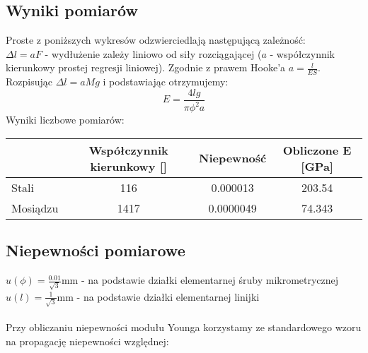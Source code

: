 \documentclass[12pt]{article}
\begin{document}
\subsection{Wyniki pomiarów}
Proste z poniższych wykresów odzwierciedlają następującą zależność: \\

$\Delta l = aF$ - wydłużenie zależy liniowo od siły rozciągającej ($a$ - współczynnik kierunkowy prostej regresji liniowej). Zgodnie z prawem Hooke'a $a =\frac{l}{ES}$. Rozpisując $\Delta l = a M g$ i podstawiając otrzymujemy:
\begin{equation}
    E = \frac{4lg}{\pi \phi^{2} a}
\end{equation}
Wyniki liczbowe pomiarów:
\begin{table}[ht]
\centering
\begin{tabular}{l|c|c|c|}
\cline{2-4}
                               & Współczynnik kierunkowy [\si{\frac{\um}{\N}}] & Niepewność & Obliczone E [\si{\GPa}] \\ \hline
\multicolumn{1}{|l|}{Stali}  & 116              & 0.000013   & 203.54\\ \hline
\multicolumn{1}{|l|}{Mosiądzu} & 1417              & 0.0000049  & 74.343 \\ \hline
\end{tabular}
\end{table}

\subsection{Niepewności pomiarowe}
$u(\phi) = \frac{0.01}{\sqrt{3}}\si{\mm}$ - na podstawie działki elementarnej śruby mikrometrycznej\\
$u(l) = \frac{1}{\sqrt{3}}\si{\mm}$ - na podstawie działki elementarnej linijki
\\\\
Przy obliczaniu niepewności modułu Younga korzystamy ze standardowego wzoru na propagację niepewności względnej: 
\end{document}
